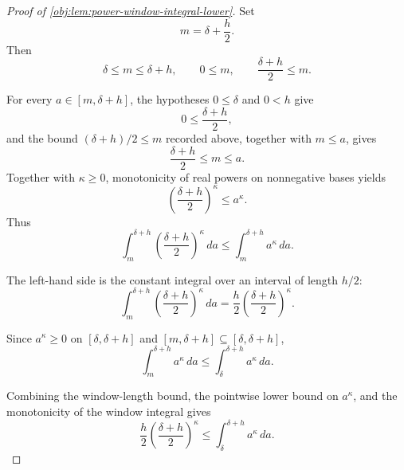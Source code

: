 \begin{proof}[Proof of \cref{obj:lem:power-window-integral-lower}]
Set
\[
m=\delta+\frac h2 .
\]
Then
\[
\delta\le m\le \delta+h,
\qquad
0\le m,
\qquad
\frac{\delta+h}{2}\le m .
\] %

For every \(a\in[m,\delta+h]\), the hypotheses \(0\le\delta\) and \(0<h\) give
\[
0\le \frac{\delta+h}{2},
\]
and the bound \((\delta+h)/2\le m\) recorded above, together with \(m\le a\), gives
\[
\frac{\delta+h}{2}\le m\le a .
\]
Together with \(\kappa\ge0\), monotonicity of real powers on nonnegative bases yields
\[
\left(\frac{\delta+h}{2}\right)^\kappa
\le
a^\kappa .
\]
Thus
\[
\int_m^{\delta+h}
\left(\frac{\delta+h}{2}\right)^\kappa\,da
\le
\int_m^{\delta+h} a^\kappa\,da .
\] %

The left-hand side is the constant integral over an interval of length \(h/2\):
\[
\int_m^{\delta+h}
\left(\frac{\delta+h}{2}\right)^\kappa\,da
=
\frac h2\left(\frac{\delta+h}{2}\right)^\kappa .
\] %

Since \(a^\kappa\ge0\) on \([\delta,\delta+h]\) and
\([m,\delta+h]\subseteq[\delta,\delta+h]\),
\[
\int_m^{\delta+h}a^\kappa\,da
\le
\int_\delta^{\delta+h}a^\kappa\,da .
\] %

Combining the window-length bound, the pointwise lower bound on \(a^\kappa\), and the
monotonicity of the window integral gives
\[
\frac h2\left(\frac{\delta+h}{2}\right)^\kappa
\le
\int_\delta^{\delta+h}a^\kappa\,da .
\] %
\end{proof}
